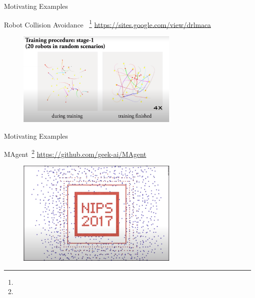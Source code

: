 \documentclass[presentation, 8pt]{beamer}\mode<presentation>{\usetheme{AMSBolognaFC}}
\begin{document}
\begin{frame}{Motivating Examples}
	\begin{exampleblock}{Robot Collision Avoidance ~\footnote[frame]{} \url{https://sites.google.com/view/drlmaca}}
		\centering
		\begin{figure}
			\href{https://www.youtube.com/watch?v=Uj1yAmlL5lk}{\includegraphics[width=0.7\textwidth]{img/collective-learning.png}}
		\end{figure}
	\end{exampleblock}
\end{frame}
\begin{frame}{Motivating Examples}
	\begin{exampleblock}{MAgent~\footnote[frame]{} \url{https://github.com/geek-ai/MAgent}}
		\begin{figure}
			\href{https://www.youtube.com/watch?v=HCSm0kVolqI}{\includegraphics[width=0.7\textwidth]{img/magent.png}}
		\end{figure}
	\end{exampleblock}
\end{frame}
\end{document}
